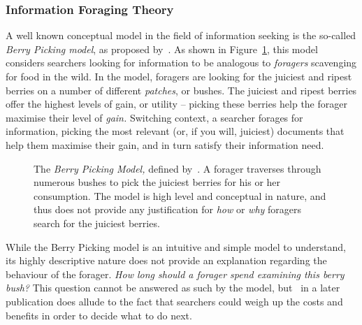 \subsubsection{Information Foraging Theory}\label{sec:stopping_background:models:theoretical:ift}
A well known conceptual model in the field of information seeking is the so-called \emph{Berry Picking model}, as proposed by~\cite{bates1989berry_picking}. As shown in Figure~\ref{fig:berry_picking}, this model considers searchers looking for information to be analogous to \emph{foragers} scavenging for food in the wild. In the model, foragers are looking for the juiciest and ripest berries on a number of different \emph{patches}, or bushes. The juiciest and ripest berries offer the highest levels of gain, or utility -- picking these berries help the forager maximise their level of \emph{gain.} Switching context, a searcher forages for information, picking the most relevant (or, if you will, juiciest) documents that help them maximise their gain, and in turn satisfy their information need.

\begin{figure}[t!]
    \centering
    \caption[The Berry Picking Model~\cite{bates1989berry_picking}]{The \emph{Berry Picking Model,} defined by~\cite{bates1989berry_picking}. A forager traverses through numerous bushes to pick the juiciest berries for his or her consumption. The model is high level and conceptual in nature, and thus does not provide any justification for \emph{how} or \emph{why} foragers search for the juiciest berries.}
    \label{fig:berry_picking}
\end{figure}

While the Berry Picking model is an intuitive and simple model to understand, its highly descriptive nature does not provide an explanation regarding the behaviour of the forager. \emph{How long should a forager spend examining this berry bush?} This question cannot be answered as such by the model, but~\cite{bates1989alluding} in a later publication does allude to the fact that searchers could weigh up the costs and benefits in order to decide what to do next.

